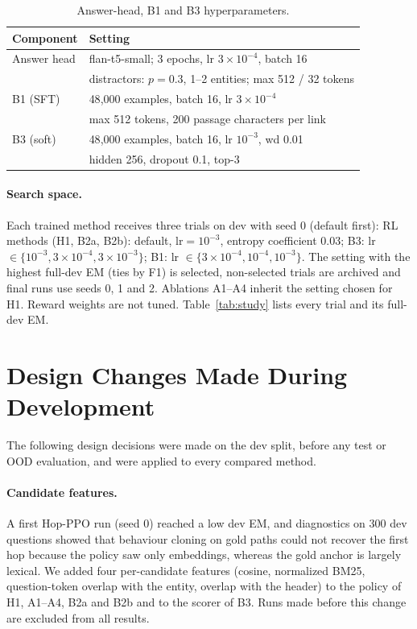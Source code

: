 \begin{table}[h]
\centering\small
\begin{tabular}{@{}p{}p{}@{}}
\toprule
Component & Setting \\
\midrule
Answer head & flan-t5-small; 3 epochs, lr $3\times10^{-4}$, batch 16 \\
 & distractors: $p=0.3$, 1--2 entities; max 512 / 32 tokens \\
B1 (SFT) & 48{,}000 examples, batch 16, lr $3\times10^{-4}$ \\
 & max 512 tokens, 200 passage characters per link \\
B3 (soft) & 48{,}000 examples, batch 16, lr $10^{-3}$, wd 0.01 \\
 & hidden 256, dropout 0.1, top-3 \\
\bottomrule
\end{tabular}
\caption{Answer-head, B1 and B3 hyperparameters.}
\label{tab:other-hp}
\end{table}

\paragraph{Search space.}
Each trained method receives three trials on dev with seed 0 (default first): RL methods (H1, B2a, B2b): default, $\text{lr}=10^{-3}$, entropy coefficient $0.03$; B3: lr $\in\{10^{-3},3\times10^{-4},3\times10^{-3}\}$; B1: lr $\in\{3\times10^{-4},10^{-4},10^{-3}\}$.
The setting with the highest full-dev EM (ties by F1) is selected, non-selected trials are archived and final runs use seeds 0, 1 and 2.
Ablations A1--A4 inherit the setting chosen for H1.
Reward weights are not tuned.
Table~\ref{tab:study} lists every trial and its full-dev EM.
\begin{table}[t]
\centering\small
\resizebox{\columnwidth}{!}{}
\caption{Tuning trials (dev, seed 0) and the selected setting per method.}
\label{tab:study}
\end{table}

\section{Design Changes Made During Development}
\label{app:changes}

The following design decisions were made on the dev split, before any test or OOD evaluation, and were applied to every compared method.
\paragraph{Candidate features.}
A first Hop-PPO run (seed 0) reached a low dev EM, and diagnostics on 300 dev questions showed that behaviour cloning on gold paths could not recover the first hop because the policy saw only embeddings, whereas the gold anchor is largely lexical.
We added four per-candidate features (cosine, normalized BM25, question-token overlap with the entity, overlap with the header) to the policy of H1, A1--A4, B2a and B2b and to the scorer of B3.
Runs made before this change are excluded from all results.
